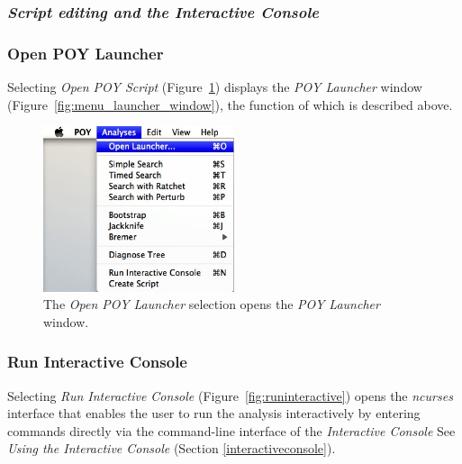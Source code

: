 {\subsubsection{\emph{Script editing and the Interactive Console}}

\subsubsection*{Open POY Launcher}

Selecting \emph{Open POY Script} (Figure~\ref{fig:open_poy_launcher}) displays the \emph{POY Launcher} 
window (Figure~\ref{fig:menu_launcher_window}), the function of which is described above.

\begin{figure}[htpb]
\begin{center}
\includegraphics[width=0.5\textwidth]{doc/figures/openpoylauncher_menu.jpg}
\end{center}
\caption{The \emph{Open POY Launcher} selection opens the \emph{POY Launcher} window.}
\label{fig:open_poy_launcher}
\end{figure}

\subsubsection*{Run Interactive Console}

Selecting \emph{Run Interactive Console} (Figure~\ref{fig:runinteractive}) opens the \emph{ncurses} interface
that enables the user to run the analysis interactively by entering \poy commands directly via the command-line 
interface of the \emph{Interactive Console} See \emph{Using the Interactive Console} (Section \ref{interactiveconsole}).

}
